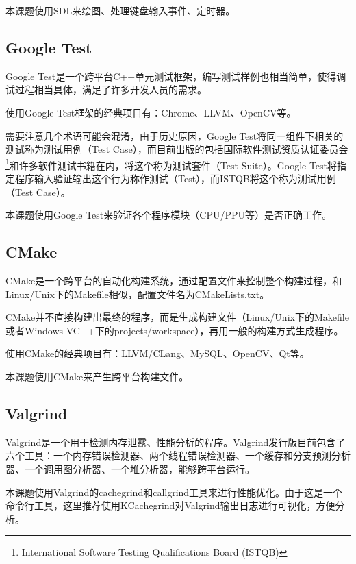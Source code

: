 \documentclass[a4paper]{ltxdoc}
\begin{document}
{本课题使用SDL来绘图、处理键盘输入事件、定时器。

\subsection{Google Test}
Google Test是一个跨平台C++单元测试框架，编写测试样例也相当简单，使得调试过程相当具体，满足了许多开发人员的需求。

使用Google Test框架的经典项目有：Chrome、LLVM、OpenCV等。

需要注意几个术语可能会混淆，由于历史原因，Google Test将同一组件下相关的测试称为测试用例（Test Case），而目前出版的包括国际软件测试资质认证委员会\footnote{International Software Testing Qualifications Board (ISTQB)}和许多软件测试书籍在内，将这个称为测试套件（Test Suite）。Google Test将指定程序输入验证输出这个行为称作测试（Test），而ISTQB将这个称为测试用例（Test Case）。

本课题使用Google Test来验证各个程序模块（CPU/PPU等）是否正确工作。

\subsection{CMake}
CMake是一个跨平台的自动化构建系统，通过配置文件来控制整个构建过程，和Linux/Unix下的Makefile相似，配置文件名为CMakeLists.txt。

CMake并不直接构建出最终的程序，而是生成构建文件（Linux/Unix下的Makefile或者Windows VC++下的projects/workspace），再用一般的构建方式生成程序。

使用CMake的经典项目有：LLVM/CLang、MySQL、OpenCV、Qt等。

本课题使用CMake来产生跨平台构建文件。
\subsection{Valgrind}
Valgrind是一个用于检测内存泄露、性能分析的程序。Valgrind发行版目前包含了六个工具：一个内存错误检测器、两个线程错误检测器、一个缓存和分支预测分析器、一个调用图分析器、一个堆分析器，能够跨平台运行。

本课题使用Valgrind的cachegrind和callgrind工具来进行性能优化。由于这是一个命令行工具，这里推荐使用KCachegrind对Valgrind输出日志进行可视化，方便分析。

}

{
\clearpage %
\nocite{*} %
}
\end{document}
